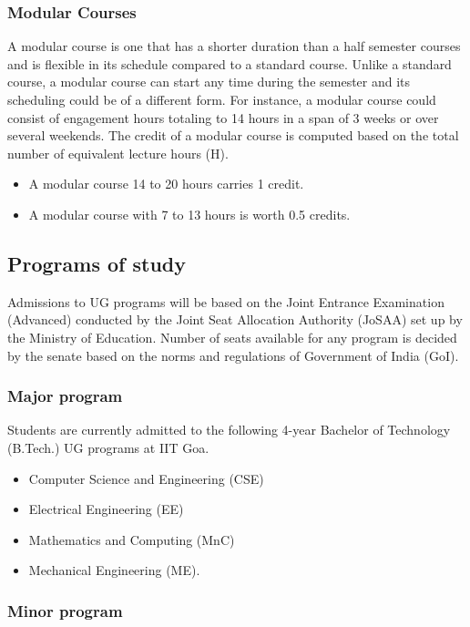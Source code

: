 \subsubsection{Modular Courses}

A modular course is one that has a shorter duration than a half semester courses and is flexible in its schedule compared to a standard course. Unlike a standard course, a modular course can start any time during the semester and its scheduling could be of a different form. For instance, a modular course could consist of engagement hours totaling to 14 hours in a span of 3 weeks or over several weekends. The credit of a modular course is computed based on the total number of equivalent lecture hours (H). 

\begin{itemize}
	\item A modular course 14 to 20 hours carries 1 credit.
	\item A modular course with 7 to 13 hours is worth 0.5 credits.
\end{itemize}

\subsection{Programs of study}

Admissions to UG programs will be based on the Joint Entrance Examination (Advanced) conducted by the Joint Seat Allocation Authority (JoSAA) set up by the Ministry of Education. Number of seats available for any program is decided by the senate based on the norms and regulations of Government of India (GoI).

\subsubsection{Major program}

Students are currently admitted to the following 4-year Bachelor of Technology (B.Tech.) UG programs at IIT Goa.

\begin{itemize}
	\item Computer Science and Engineering (CSE)
	\item Electrical Engineering (EE)
	\item Mathematics and Computing (MnC)
	\item Mechanical Engineering (ME).
\end{itemize}

\subsubsection{Minor program}

